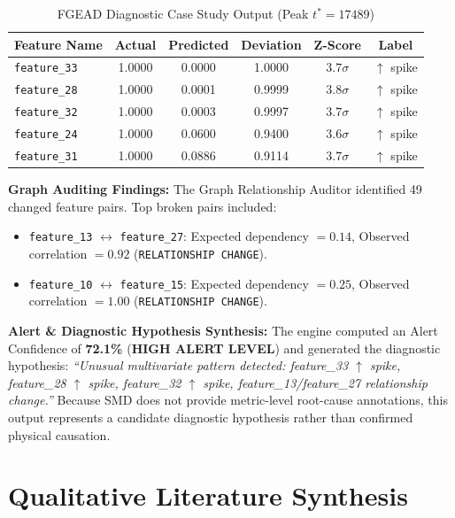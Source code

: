 \documentclass[conference]{IEEEtran}
\begin{document}
\begin{table}[h]
\caption{FGEAD Diagnostic Case Study Output (Peak $t^* = 17489$)}
\label{tab:case_study}
\centering
\begin{tabular}{lccccc}
\toprule
\textbf{Feature Name} & \textbf{Actual} & \textbf{Predicted} & \textbf{Deviation} & \textbf{Z-Score} & \textbf{Label} \\
\midrule
\texttt{feature\_33} & 1.0000 & 0.0000 & 1.0000 & $3.7\sigma$ & $\uparrow$ spike \\
\texttt{feature\_28} & 1.0000 & 0.0001 & 0.9999 & $3.8\sigma$ & $\uparrow$ spike \\
\texttt{feature\_32} & 1.0000 & 0.0003 & 0.9997 & $3.7\sigma$ & $\uparrow$ spike \\
\texttt{feature\_24} & 1.0000 & 0.0600 & 0.9400 & $3.6\sigma$ & $\uparrow$ spike \\
\texttt{feature\_31} & 1.0000 & 0.0886 & 0.9114 & $3.7\sigma$ & $\uparrow$ spike \\
\bottomrule
\end{tabular}
\end{table}

\textbf{Graph Auditing Findings:} The Graph Relationship Auditor identified 49 changed feature pairs. Top broken pairs included:
\begin{itemize}
    \item \texttt{feature\_13} $\leftrightarrow$ \texttt{feature\_27}: Expected dependency $= 0.14$, Observed correlation $= 0.92$ (\texttt{RELATIONSHIP CHANGE}).
    \item \texttt{feature\_10} $\leftrightarrow$ \texttt{feature\_15}: Expected dependency $= 0.25$, Observed correlation $= 1.00$ (\texttt{RELATIONSHIP CHANGE}).
\end{itemize}

\textbf{Alert \& Diagnostic Hypothesis Synthesis:} The engine computed an Alert Confidence of \textbf{72.1\%} (\textbf{HIGH ALERT LEVEL}) and generated the diagnostic hypothesis:
\textit{``Unusual multivariate pattern detected: feature\_33 $\uparrow$ spike, feature\_28 $\uparrow$ spike, feature\_32 $\uparrow$ spike, feature\_13/feature\_27 relationship change.''} Because SMD does not provide metric-level root-cause annotations, this output represents a candidate diagnostic hypothesis rather than confirmed physical causation.

\section{Qualitative Literature Synthesis}
\end{document}
